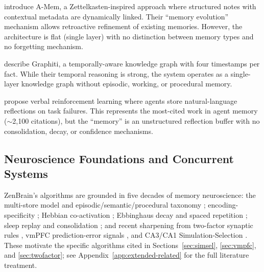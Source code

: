 \documentclass{article}
\begin{document}
\citet{xu2025amem} introduce A-Mem, a Zettelkasten-inspired approach
where structured notes with contextual metadata are dynamically linked.
Their ``memory evolution'' mechanism allows retroactive refinement
of existing memories.
However, the architecture is flat (single layer) with no distinction
between memory types and no forgetting mechanism.

\citet{rasmussen2025zep} describe Graphiti, a temporally-aware
knowledge graph with four timestamps per fact.
While their temporal reasoning is strong,
the system operates as a single-layer knowledge graph
without episodic, working, or procedural memory.

\citet{shinn2023reflexion} propose verbal reinforcement learning
where agents store natural-language reflections on task failures.
This represents the most-cited work in agent memory ($\sim$2{,}100 citations),
but the ``memory'' is an unstructured reflection buffer
with no consolidation, decay, or confidence mechanisms.

\subsection{Neuroscience Foundations and Concurrent Systems}
\label{sec:related-neuro}

ZenBrain's algorithms are grounded in five decades of memory neuroscience:
the multi-store model and episodic/semantic/procedural taxonomy
\citep{atkinson1968,tulving1972,cohen1980}; encoding-specificity
\citep{tulving1973}; Hebbian co-activation
\citep{hebb1949}; Ebbinghaus decay and spaced repetition
\citep{ebbinghaus1885,pimsleur1967}; sleep replay and consolidation
\citep{stickgold2013,ji2007,oneill2010,mcgaugh2004}; and recent sharpening
from two-factor synaptic rules \citep{zenke2025,zenke2017}, vmPFC
prediction-error signals \citep{zou2025}, and CA3/CA1 Simulation-Selection
\citep{chen2025,kumaran2016,squire1992}. These motivate the specific
algorithms cited in Sections~\ref{sec:simsel}, \ref{sec:vmpfc}, and
\ref{sec:twofactor}; see Appendix~\ref{app:extended-related} for the
full literature treatment.
\end{document}
